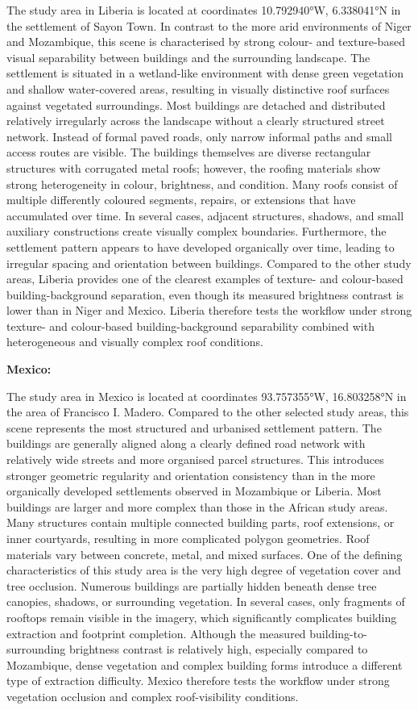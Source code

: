 The study area in Liberia is located at coordinates 10.792940°W, 6.338041°N in the settlement of Sayon Town. In contrast to the more arid environments of Niger and Mozambique, this scene is characterised by strong colour- and texture-based visual separability between buildings and the surrounding landscape. The settlement is situated in a wetland-like environment with dense green vegetation and shallow water-covered areas, resulting in visually distinctive roof surfaces against vegetated surroundings. Most buildings are detached and distributed relatively irregularly across the landscape without a clearly structured street network. Instead of formal paved roads, only narrow informal paths and small access routes are visible. The buildings themselves are diverse rectangular structures with corrugated metal roofs; however, the roofing materials show strong heterogeneity in colour, brightness, and condition. Many roofs consist of multiple differently coloured segments, repairs, or extensions that have accumulated over time. In several cases, adjacent structures, shadows, and small auxiliary constructions create visually complex boundaries. Furthermore, the settlement pattern appears to have developed organically over time, leading to irregular spacing and orientation between buildings. Compared to the other study areas, Liberia provides one of the clearest examples of texture- and colour-based building-background separation, even though its measured brightness contrast is lower than in Niger and Mexico. Liberia therefore tests the workflow under strong texture- and colour-based building-background separability combined with heterogeneous and visually complex roof conditions.

\textbf{Mexico:}

The study area in Mexico is located at coordinates 93.757355°W, 16.803258°N in the area of Francisco I. Madero. Compared to the other selected study areas, this scene represents the most structured and urbanised settlement pattern. The buildings are generally aligned along a clearly defined road network with relatively wide streets and more organised parcel structures. This introduces stronger geometric regularity and orientation consistency than in the more organically developed settlements observed in Mozambique or Liberia. Most buildings are larger and more complex than those in the African study areas. Many structures contain multiple connected building parts, roof extensions, or inner courtyards, resulting in more complicated polygon geometries. Roof materials vary between concrete, metal, and mixed surfaces. One of the defining characteristics of this study area is the very high degree of vegetation cover and tree occlusion. Numerous buildings are partially hidden beneath dense tree canopies, shadows, or surrounding vegetation. In several cases, only fragments of rooftops remain visible in the imagery, which significantly complicates building extraction and footprint completion. Although the measured building-to-surrounding brightness contrast is relatively high, especially compared to Mozambique, dense vegetation and complex building forms introduce a different type of extraction difficulty. Mexico therefore tests the workflow under strong vegetation occlusion and complex roof-visibility conditions.

